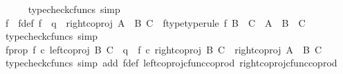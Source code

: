 \begin{isabellebody}
\ \ \ \ \isamarkupfalse%
\ {\isacharparenleft}{\kern0pt}typecheck{\isacharunderscore}{\kern0pt}cfuncs{\isacharcomma}{\kern0pt}\ simp{\isacharparenright}{\kern0pt}\ \ \isanewline
\ \ \isamarkupfalse%
\ f\ \ f{\isacharunderscore}{\kern0pt}def{\isacharcolon}{\kern0pt}\ {\isachardoublequoteopen}f\ {\isacharequal}{\kern0pt}\ q\ {\isasymamalg}\ {\isacharparenleft}{\kern0pt}right{\isacharunderscore}{\kern0pt}coproj\ {\isacharparenleft}{\kern0pt}A\ {\isasymCoprod}\ B{\isacharparenright}{\kern0pt}\ C{\isacharparenright}{\kern0pt}{\isachardoublequoteclose}\ \ f{\isacharunderscore}{\kern0pt}type{\isacharbrackleft}{\kern0pt}type{\isacharunderscore}{\kern0pt}rule{\isacharbrackright}{\kern0pt}{\isacharcolon}{\kern0pt}\ {\isachardoublequoteopen}{\isacharparenleft}{\kern0pt}f{\isacharcolon}{\kern0pt}\ {\isacharparenleft}{\kern0pt}B\ {\isasymCoprod}\ C{\isacharparenright}{\kern0pt}\ {\isasymrightarrow}\ {\isacharparenleft}{\kern0pt}{\isacharparenleft}{\kern0pt}A\ {\isasymCoprod}\ B{\isacharparenright}{\kern0pt}\ {\isasymCoprod}\ C{\isacharparenright}{\kern0pt}{\isacharparenright}{\kern0pt}{\isachardoublequoteclose}\isanewline
\ \ \ \ \isamarkupfalse%
\ {\isacharparenleft}{\kern0pt}typecheck{\isacharunderscore}{\kern0pt}cfuncs{\isacharcomma}{\kern0pt}\ simp{\isacharparenright}{\kern0pt}\isanewline
\ \ \isamarkupfalse%
\ f{\isacharunderscore}{\kern0pt}prop{\isacharcolon}{\kern0pt}\ {\isachardoublequoteopen}{\isacharparenleft}{\kern0pt}f\ {\isasymcirc}\isactrlsub c\ left{\isacharunderscore}{\kern0pt}coproj\ B\ C\ {\isacharequal}{\kern0pt}\ q{\isacharparenright}{\kern0pt}\ {\isasymand}\ {\isacharparenleft}{\kern0pt}f\ {\isasymcirc}\isactrlsub c\ right{\isacharunderscore}{\kern0pt}coproj\ B\ C\ {\isacharequal}{\kern0pt}\ right{\isacharunderscore}{\kern0pt}coproj\ {\isacharparenleft}{\kern0pt}A\ {\isasymCoprod}\ B{\isacharparenright}{\kern0pt}\ C{\isacharparenright}{\kern0pt}{\isachardoublequoteclose}\isanewline
\ \ \ \ \isamarkupfalse%
\ {\isacharparenleft}{\kern0pt}typecheck{\isacharunderscore}{\kern0pt}cfuncs{\isacharcomma}{\kern0pt}\ simp\ add{\isacharcolon}{\kern0pt}\ f{\isacharunderscore}{\kern0pt}def\ left{\isacharunderscore}{\kern0pt}coproj{\isacharunderscore}{\kern0pt}cfunc{\isacharunderscore}{\kern0pt}coprod\ right{\isacharunderscore}{\kern0pt}coproj{\isacharunderscore}{\kern0pt}cfunc{\isacharunderscore}{\kern0pt}coprod{\isacharparenright}{\kern0pt}\isanewline
\ \ \isamarkupfalse%
\ \isamarkupfalse%

\end{isabellebody}
